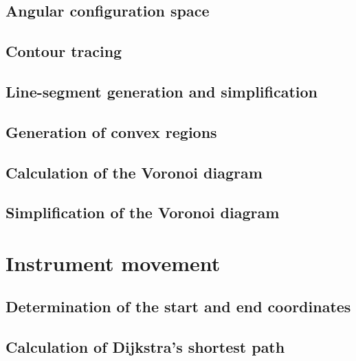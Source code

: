 \subsection{Angular configuration space}


\subsection{Contour tracing}


\subsection{Line-segment generation and simplification}


\subsection{Generation of convex regions}


\subsection{Calculation of the Voronoi diagram}
\label{sec:voronoi}


\subsection{Simplification of the Voronoi diagram}







\section{Instrument movement}
\label{sec:exepath}


\subsection{Determination of the start and end coordinates}



\subsection{Calculation of Dijkstra's shortest path}
\label{sec:dijkstra}


